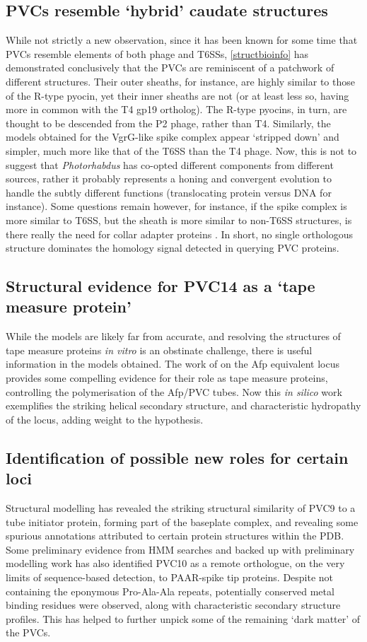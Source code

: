 \subsection{PVCs resemble `hybrid' caudate structures}
While not strictly a new observation, since it has been known for some time that PVCs resemble elements of both phage and T6SSs, \vref{structbioinfo} has demonstrated conclusively that the PVCs are reminiscent of a patchwork of different structures. Their outer sheaths, for instance, are highly similar to those of the R-type pyocin, yet their inner sheaths are not (or at least less so, having more in common with the T4 gp19 ortholog). The R-type pyocins, in turn, are thought to be descended from the P2 phage, rather than T4. Similarly, the models obtained for the VgrG-like spike complex appear `stripped down' and simpler, much more like that of the T6SS than the T4 phage. Now, this is not to suggest that \emph{Photorhabdus} has co-opted different components from different sources, rather it probably represents a honing and convergent evolution to handle the subtly different functions (translocating protein versus DNA for instance). Some questions remain however, for instance, if the spike complex is more similar to T6SS, but the sheath is more similar to non-T6SS structures, is there really the need for collar adapter proteins \citep{Renault2018}. In short, no single orthologous structure dominates the homology signal detected in querying PVC proteins.

\subsection{Structural evidence for PVC14 as a `tape measure protein'}
While the models are likely far from accurate, and resolving the structures of tape measure proteins \emph{in vitro} is an obstinate challenge, there is useful information in the models obtained. The work of \cite{Rybakova2015} on the Afp equivalent locus provides some compelling evidence for their role as tape measure proteins, controlling the polymerisation of the Afp/PVC tubes. Now this \emph{in silico} work exemplifies the striking helical secondary structure, and characteristic hydropathy of the locus, adding weight to the hypothesis.

\subsection{Identification of possible new roles for certain loci}
Structural modelling has revealed the striking structural similarity of PVC9 to a tube initiator protein, forming part of the baseplate complex, and revealing some spurious annotations attributed to certain protein structures within the PDB. Some preliminary evidence from HMM searches and backed up with preliminary modelling work has also identified PVC10 as a remote orthologue, on the very limits of sequence-based detection, to PAAR-spike tip proteins. Despite not containing the eponymous Pro-Ala-Ala repeats, potentially conserved metal binding residues were observed, along with characteristic secondary structure profiles. This has helped to further unpick some of the remaining `dark matter' of the PVCs.


